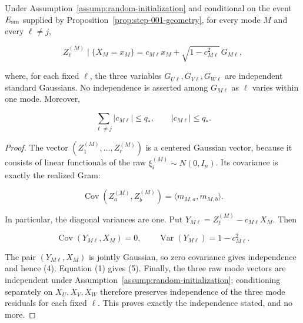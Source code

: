 \begin{lemma}\label{lem:step-002-regression}
Under Assumption~\ref{assump:random-initialization} and conditional on the
event $E_{\rm sm}$ supplied by Proposition~\ref{prop:step-001-geometry},
for every mode $M$ and every $\ell\ne j$,

\[
Z_{\ell}^{(M)}\mid\{X_M=x_M\}
=c_{M\ell}x_M+\sqrt{1-c_{M\ell}^2}\,G_{M\ell},
\tag{4}
\]

where, for each fixed $\ell$, the three variables
$G_{U\ell},G_{V\ell},G_{W\ell}$ are independent standard Gaussians. No
independence is asserted among $G_{M\ell}$ as $\ell$ varies within one mode.
Moreover,

\[
\sum_{\ell\ne j}|c_{M\ell}|\le q_*,
\qquad |c_{M\ell}|\le q_*.
\tag{5}
\]

\begin{proof}
The vector $(Z_1^{(M)},\ldots,Z_r^{(M)})$ is a centered Gaussian vector,
because it consists of linear functionals of the raw
$\xi_i^{(M)}\sim N(0,I_n)$. Its covariance is exactly the realized Gram:

\[
\operatorname{Cov}(Z_a^{(M)},Z_b^{(M)})
=\langle m_{M,a},m_{M,b}\rangle .
\tag{6}
\]

In particular, the diagonal variances are one. Put
$Y_{M\ell}=Z_{\ell}^{(M)}-c_{M\ell}X_M$. Then

\[
\operatorname{Cov}(Y_{M\ell},X_M)=0,\qquad
\operatorname{Var}(Y_{M\ell})=1-c_{M\ell}^2.
\tag{7}
\]

The pair $(Y_{M\ell},X_M)$ is jointly Gaussian, so zero covariance gives
independence and hence (4). Equation (1) gives (5). Finally, the three raw
mode vectors are independent under
Assumption~\ref{assump:random-initialization}; conditioning separately on
$X_U,X_V,X_W$ therefore preserves independence of the three mode residuals
for each fixed $\ell$. This proves exactly the independence stated, and no
more. 


\end{proof}
\end{lemma}
